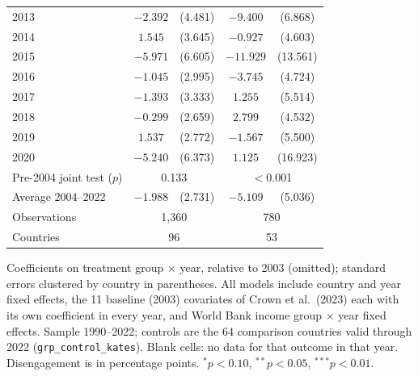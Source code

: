 \begin{table}[htbp]
\begin{tabular}{lcccc}
2013 & $-2.392$ & (4.481) & $-9.400$ & (6.868) \\
2014 & $1.545$ & (3.645) & $-0.927$ & (4.603) \\
2015 & $-5.971$ & (6.605) & $-11.929$ & (13.561) \\
2016 & $-1.045$ & (2.995) & $-3.745$ & (4.724) \\
2017 & $-1.393$ & (3.333) & $1.255$ & (5.514) \\
2018 & $-0.299$ & (2.659) & $2.799$ & (4.532) \\
2019 & $1.537$ & (2.772) & $-1.567$ & (5.500) \\
2020 & $-5.240$ & (6.373) & $1.125$ & (16.923) \\
\midrule
Pre-2004 joint test ($p$) & \multicolumn{2}{c}{0.133} & \multicolumn{2}{c}{$<$0.001} \\
Average 2004--2022 & $-1.988$ & (2.731) & $-5.109$ & (5.036) \\
Observations & \multicolumn{2}{c}{1,360} & \multicolumn{2}{c}{780} \\
Countries & \multicolumn{2}{c}{96} & \multicolumn{2}{c}{53} \\
\bottomrule
\end{tabular}
\par\vspace{4pt}
\begin{minipage}{\textwidth}\footnotesize Coefficients on treatment group $\times$ year, relative to 2003 (omitted); standard errors clustered by country in parentheses. All models include country and year fixed effects, the 11 baseline (2003) covariates of Crown et al.\ (2023) each with its own coefficient in every year, and World Bank income group $\times$ year fixed effects. Sample 1990--2022; controls are the 64 comparison countries valid through 2022 (\texttt{grp\_control\_kates}). Blank cells: no data for that outcome in that year. Disengagement is in percentage points. $^{*}p<0.10$, $^{**}p<0.05$, $^{***}p<0.01$.\end{minipage}
\end{table}
